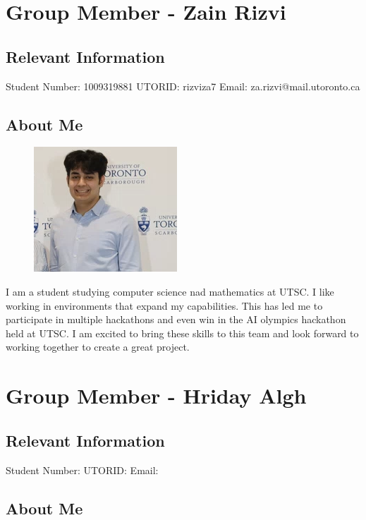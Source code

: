 \documentclass{article}
\begin{document}
\noindent\makebox[\linewidth]{\rule{\paperwidth}{0.4pt}}

\section{Group Member - Zain Rizvi}
\subsection{Relevant Information}
    Student Number: 1009319881  \newline
    UTORID: rizviza7  \newline
    Email: za.rizvi@mail.utoronto.ca
\subsection{About Me}
\begin{figure}[h]
    \centering
    \includegraphics[width=0.25\linewidth]{images/ZainRizvi.png}
\end{figure}
I am a student studying computer science nad mathematics at UTSC. I like working in environments that expand my capabilities. This has led me to participate in multiple hackathons and even win in the AI olympics hackathon held at UTSC. I am excited to bring these skills to this team and look forward to working together to create a great project.

\noindent\makebox[\linewidth]{\rule{\paperwidth}{0.4pt}}

\section{Group Member - Hriday Algh}
\subsection{Relevant Information}
    Student Number:  \newline
    UTORID:  \newline
    Email: 
\subsection{About Me}
\end{document}
